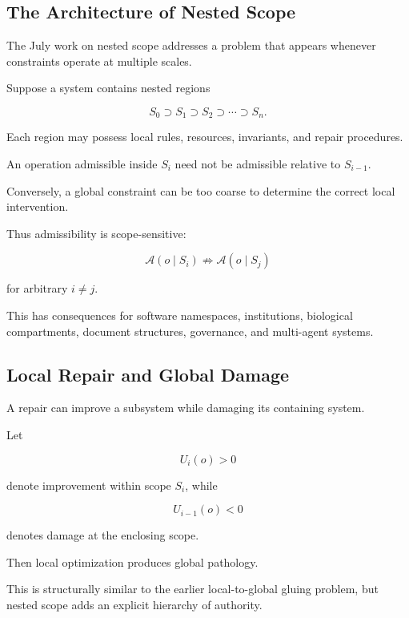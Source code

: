 \documentclass[11pt]{article}
\theoremstyle{remark}
\newcommand{\Adm}{\mathcal{A}}
\begin{document}
\subsection{The Architecture of Nested Scope}

The July work on nested scope addresses a problem that appears whenever constraints operate at multiple scales.

Suppose a system contains nested regions

\begin{equation}
S_0
\supset
S_1
\supset
S_2
\supset
\cdots
\supset
S_n.
\end{equation}

Each region may possess local rules, resources, invariants, and repair procedures.

An operation admissible inside $S_i$ need not be admissible relative to $S_{i-1}$.

Conversely, a global constraint can be too coarse to determine the correct local intervention.

Thus admissibility is scope-sensitive:

\begin{equation}
\Adm(o\mid S_i)
\not\Rightarrow
\Adm(o\mid S_j)
\end{equation}

for arbitrary $i\neq j$.

This has consequences for software namespaces, institutions, biological compartments, document structures, governance, and multi-agent systems.

\subsection{Local Repair and Global Damage}

A repair can improve a subsystem while damaging its containing system.

Let

\begin{equation}
U_i(o)>0
\end{equation}

denote improvement within scope $S_i$, while

\begin{equation}
U_{i-1}(o)<0
\end{equation}

denotes damage at the enclosing scope.

Then local optimization produces global pathology.

This is structurally similar to the earlier local-to-global gluing problem, but nested scope adds an explicit hierarchy of authority.
\end{document}
